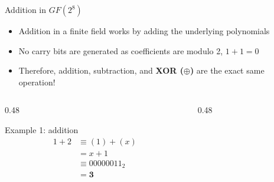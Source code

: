\documentclass{cubeamer}
\begin{document}
\begin{frame}{Addition in $GF(2^8)$}
    \begin{itemize}
        \item Addition in a finite field works by adding the underlying polynomials
        \item No carry bits are generated as coefficients are modulo 2, $1 + 1 = 0$
        \item Therefore, addition, subtraction, and \textbf{XOR ($\oplus$)} are the exact same operation! 
    \end{itemize}
    \pause

    \begin{columns}[T] %
        \begin{column}{0.48\textwidth}
            \begin{block}{Example 1: addition}
                \begin{align*}
                    1 + 2 &\equiv (1) + (x) \\
                          &= x + 1 \\
                          &\equiv 00000011_2 \\
                          &= \mathbf{3}
                \end{align*}
            \end{block}
        \end{column}

        \begin{column}{0.48\textwidth}
        \end{column}
    \end{columns}
\end{frame}
\end{document}
